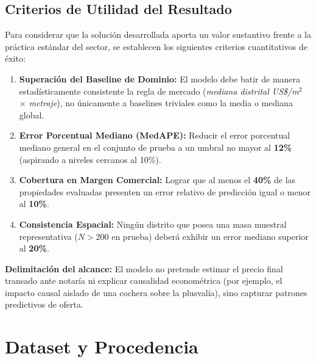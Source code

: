 \documentclass[11pt,a4paper]{article}
\begin{document}
\subsection{Criterios de Utilidad del Resultado}
Para considerar que la solución desarrollada aporta un valor sustantivo frente a la práctica estándar del sector, se establecen los siguientes criterios cuantitativos de éxito:
\begin{enumerate}[leftmargin=1.5cm]
    \item \textbf{Superación del Baseline de Dominio:} El modelo debe batir de manera estadísticamente consistente la regla de mercado (\textit{mediana distrital US\$/m$^2$ $\times$ metraje}), no únicamente a baselines triviales como la media o mediana global.
    \item \textbf{Error Porcentual Mediano (MedAPE):} Reducir el error porcentual mediano general en el conjunto de prueba a un umbral no mayor al \textbf{12\%} (aspirando a niveles cercanos al 10\%).
    \item \textbf{Cobertura en Margen Comercial:} Lograr que al menos el \textbf{40\%} de las propiedades evaluadas presenten un error relativo de predicción igual o menor al \textbf{10\%}.
    \item \textbf{Consistencia Espacial:} Ningún distrito que posea una masa muestral representativa ($N > 200$ en prueba) deberá exhibir un error mediano superior al \textbf{20\%}.
\end{enumerate}

\noindent \textbf{Delimitación del alcance:} El modelo no pretende estimar el precio final transado ante notaría ni explicar causalidad econométrica (por ejemplo, el impacto causal aislado de una cochera sobre la plusvalía), sino capturar patrones predictivos de oferta.

\section{Dataset y Procedencia}
\end{document}
